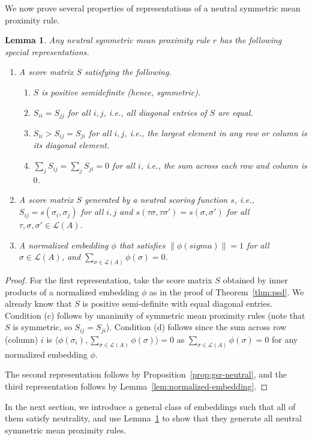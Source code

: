\documentclass[10pt,letterpaper]{article}
\newcommand{\calL}{{\mathcal{L}}}
\newcommand{\rank}{{\calL(A)}}
\newtheorem{lemma}{Lemma}
\begin{document}
We now prove several properties of representations of a neutral symmetric mean proximity rule. 
\begin{lemma}
Any neutral symmetric mean proximity rule $r$ has the following special representations. 
\begin{enumerate}
\item A score matrix $S$ satisfying the following.
\begin{enumerate}
\item $S$ is positive semidefinite (hence, symmetric).
\item $S_{ii} = S_{jj}$ for all $i,j$, i.e., all diagonal entries of $S$ are equal.
\item $S_{ii} > S_{ij} = S_{ji}$ for all $i,j$, i.e., the largest element in any row or column is its diagonal element.
\item $\sum_j S_{ij} = \sum_{j} S_{ji} = 0$ for all $i$, i.e., the sum across each row and column is $0$. 
\end{enumerate}
\item A score matrix $S$ generated by a neutral scoring function $s$, i.e., $S_{ij} = s(\sigma_i,\sigma_j)$ for all $i,j$ and $s(\tau \sigma,\tau \sigma') = s(\sigma,\sigma')$ for all $\tau,\sigma,\sigma' \in \rank$.
\item A normalized embedding $\phi$ that satisfies $\|\phi(sigma)\| = 1$ for all $\sigma \in \rank$, and $\sum_{\sigma \in \rank} \phi(\sigma) = 0$.
\end{enumerate}
\label{lem:neutral-mean-proximity-properties}
\end{lemma}
\begin{proof}
For the first representation, take the score matrix $S$ obtained by inner products of a normalized embedding $\phi$ as in the proof of Theorem~\ref{thm:psd}. We already know that $S$ is positive semi-definite with equal diagonal entries. Condition (c) follows by unanimity of symmetric mean proximity rules (note that $S$ is symmetric, so $S_{ij} = S_{ji}$). Condition (d) follows since the sum across row (column) $i$ is $\langle \phi(\sigma_i),\sum_{\sigma \in \rank} \phi(\sigma) \rangle = 0$ as $\sum_{\sigma \in \rank} \phi(\sigma) = 0$ for any normalized embedding $\phi$. 

The second representation follows by Proposition~\ref{prop:gsr-neutral}, and the third representation follows by Lemma~\ref{lem:normalized-embedding}. 
\end{proof}


In the next section, we introduce a general class of embeddings such that all of them satisfy neutrality, and use Lemma~\ref{lem:neutral-mean-proximity-properties} to show that they generate all neutral symmetric mean proximity rules.
\end{document}
